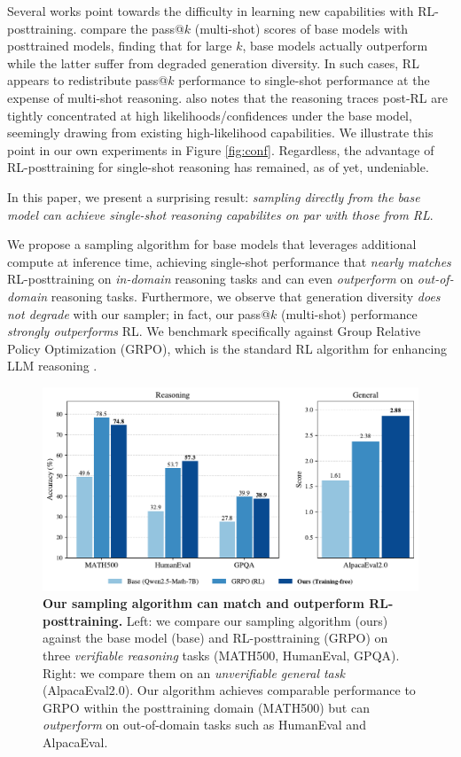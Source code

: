 \documentclass{article}
\begin{document}
Several works point towards the difficulty in learning new capabilities with RL-posttraining. \cite{he2025rewarding,song2025-outcomebasedexploration} compare the pass@$k$ (multi-shot) scores of base models with posttrained models, finding that for large $k$, base models actually outperform while the latter suffer from degraded generation diversity. In such cases, RL appears to redistribute pass@$k$ performance to single-shot performance at the expense of multi-shot reasoning. \cite{yue2025doesrlincentivizereasoning} also notes that the reasoning traces post-RL are tightly concentrated at high likelihoods/confidences under the base model, seemingly drawing from existing high-likelihood capabilities. We illustrate this point in our own experiments in Figure  \ref{fig:conf}. Regardless, the advantage of RL-posttraining for single-shot reasoning has remained, as of yet, undeniable.

In this paper, we present a surprising result: \textit{sampling directly from the base model can achieve single-shot reasoning capabilites on par with those from RL}.



We propose a sampling algorithm for base models that leverages additional compute at inference time, achieving single-shot performance that \textit{nearly matches} RL-posttraining on \textit{in-domain} reasoning tasks and can even \textit{outperform} on \textit{out-of-domain} reasoning tasks. Furthermore, we observe that generation diversity \textit{does not degrade} with our sampler; in fact, our pass@$k$ (multi-shot) performance \textit{strongly outperforms} RL. We benchmark specifically against Group Relative Policy Optimization (GRPO), which is the standard RL algorithm for enhancing LLM reasoning \citep{shao2024deepseekmath}.

\begin{figure}[t]
  \centering
  \includegraphics[width=\linewidth]{teaser.pdf}
  \captionsetup{font=small}
  \caption{\textbf{Our sampling algorithm can match and outperform RL-posttraining.} Left: we compare our sampling algorithm (ours) against the base model (base) and RL-posttraining (GRPO) on three \textit{verifiable reasoning} tasks (MATH500, HumanEval, GPQA). Right: we compare them on an \textit{unverifiable general task} (AlpacaEval2.0). Our algorithm achieves comparable performance to GRPO within the posttraining domain (MATH500) but can \textit{outperform} on  out-of-domain tasks such as HumanEval and AlpacaEval.}
  \label{fig:teaser}
\end{figure}
\end{document}
